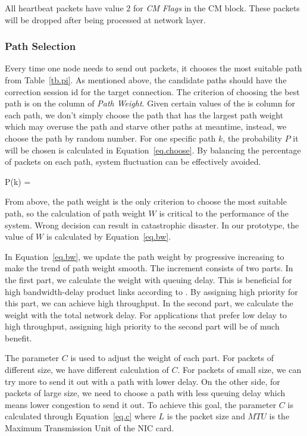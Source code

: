 All heartbeat packets have value $2$ for \emph{CM Flags} in the CM block. These packets will be dropped after being processed at network layer.


\subsubsection{Path Selection}
\label{sec:selection}

Every time one node needs to send out packets, it chooses the most suitable path from Table~\ref{tb.pi}. As mentioned above, the candidate paths should have the correction session id for the target connection. The criterion of choosing the best path is on the column of \emph{Path Weight}. Given certain values of the is column for each path, we don\textquoteright t simply choose the path that has the largest path weight which may overuse the path and starve other paths at meantime, instead, we choose the path by random number. For one specific path $k$, the probability $P$ it will be chosen is calculated in Equation~\ref{eq.choose}. By balancing the percentage of packets on each path, system fluctuation can be effectively avoided.

\be
\label{eq.choose}
P(k) = 
\ee

From above, the path weight is the only criterion to choose the most suitable path, so the calculation of path weight $W$ is critical to the performance of the system. Wrong decision can result in catastrophic disaster. In our prototype, the value of $W$ is calculated by Equation~\ref{eq.bw}. 

In Equation~\ref{eq.bw}, we update the path weight by progressive increasing to make the trend of path weight smooth. The increment consists of two parts. In the first part, we calculate the weight with queuing delay. This is beneficial for high bandwidth-delay product links according to \cite{mptcp}. By assigning high priority for this part, we can achieve high throughput. In the second part, we calculate the weight with the total network delay. For applications that prefer low delay to high throughput, assigning high priority to the second part will be of much benefit. 

The parameter $C$ is used to adjust the weight of each part. For packets of different size, we have different calculation of $C$. For packets of small size, we can try more to send it out with a path with lower delay. On the other side, for packets of large size, we need to choose a path with less queuing delay which means lower congestion to send it out. To achieve this goal, the parameter $C$ is calculated through Equation~\ref{eq.c} where $L$ is the packet size and $MTU$ is the Maximum Transmission Unit of the NIC card.

